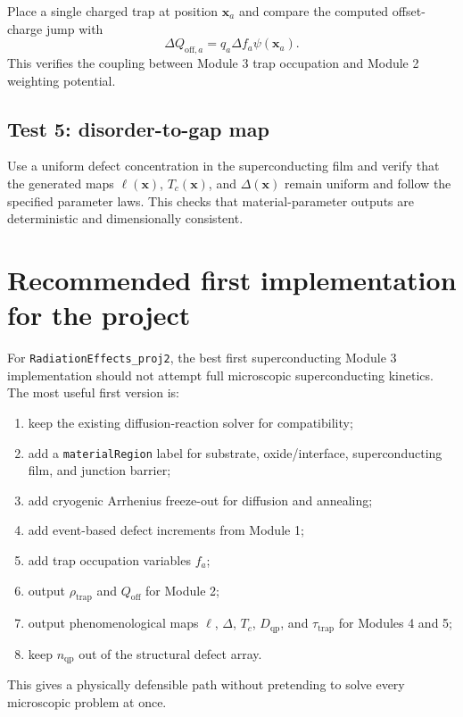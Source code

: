 \documentclass[11pt]{article}
\newcommand{\x}{\mathbf{x}}
\begin{document}
Place a single charged trap at position $\x_a$ and compare the computed offset-charge jump with
\begin{equation}
\Delta Q_{\mathrm{off},a}=q_a\Delta f_a\psi(\x_a).
\end{equation}
This verifies the coupling between Module 3 trap occupation and Module 2 weighting potential.

\subsection{Test 5: disorder-to-gap map}

Use a uniform defect concentration in the superconducting film and verify that the generated maps $\ell(\x)$, $T_c(\x)$, and $\Delta(\x)$ remain uniform and follow the specified parameter laws. This checks that material-parameter outputs are deterministic and dimensionally consistent.

\section{Recommended first implementation for the project}

For \texttt{RadiationEffects\_proj2}, the best first superconducting Module 3 implementation should not attempt full microscopic superconducting kinetics. The most useful first version is:
\begin{enumerate}[label=\arabic*.]
\item keep the existing diffusion-reaction solver for compatibility;
\item add a \texttt{materialRegion} label for substrate, oxide/interface, superconducting film, and junction barrier;
\item add cryogenic Arrhenius freeze-out for diffusion and annealing;
\item add event-based defect increments from Module 1;
\item add trap occupation variables $f_a$;
\item output $\rho_{\mathrm{trap}}$ and $Q_{\mathrm{off}}$ for Module 2;
\item output phenomenological maps $\ell$, $\Delta$, $T_c$, $D_{\mathrm{qp}}$, and $\tau_{\mathrm{trap}}$ for Modules 4 and 5;
\item keep $n_{\mathrm{qp}}$ out of the structural defect array.
\end{enumerate}

This gives a physically defensible path without pretending to solve every microscopic problem at once.
\end{document}

